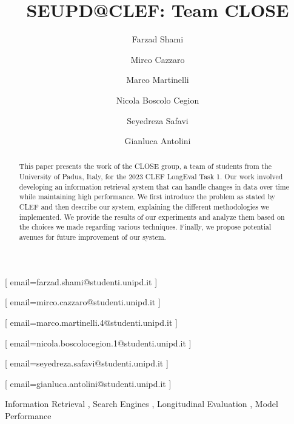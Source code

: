 \documentclass{ceurart}
\begin{document}


\title{SEUPD@CLEF: Team CLOSE}

\author[1]{Farzad Shami}[%
email=farzad.shami@studenti.unipd.it
]

\author[1]{Mirco Cazzaro}[%
email=mirco.cazzaro@studenti.unipd.it
]

\author[1]{Marco Martinelli}[%
email=marco.martinelli.4@studenti.unipd.it
]

\author[1]{Nicola Boscolo Cegion}[%
email=nicola.boscolocegion.1@studenti.unipd.it
]

\author[1]{Seyedreza Safavi}[%
email=seyedreza.safavi@studenti.unipd.it
]

\author[1]{Gianluca Antolini}[%
email=gianluca.antolini@studenti.unipd.it
]

\address[1]{University of Padua, Italy}


\begin{abstract}
  This paper presents the work of the CLOSE group, a team of students from the University of Padua, Italy, for the 2023 CLEF LongEval Task 1.
  Our work involved developing an information retrieval system that can handle changes in data over time while maintaining high performance.
  We first introduce the problem as stated by CLEF and then describe our system, explaining the different methodologies we implemented.
  We provide the results of our experiments and analyze them based on the choices we made regarding various techniques.
  Finally, we propose potential avenues for future improvement of our system.
\end{abstract}

\begin{keywords}
  Information Retrieval \sep
  Search Engines \sep
  Longitudinal Evaluation \sep
  Model Performance
\end{keywords}
\end{document}
